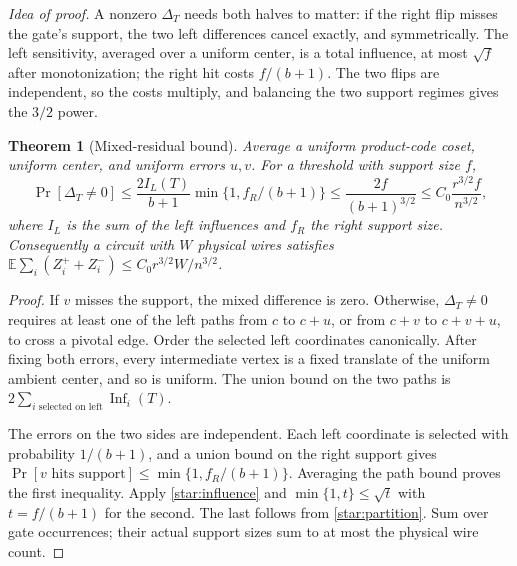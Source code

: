 \documentclass[11pt,letterpaper]{article}
\newtheorem{theorem}{Theorem}[section]
\theoremstyle{definition}
\theoremstyle{remark}
\newcommand{\E}{\mathbb E}
\newcommand{\Inf}{\operatorname{Inf}}
\begin{document}
\emph{Idea of proof.} A nonzero $\Delta_T$ needs both halves to
matter: if the right flip misses the gate's support, the two left
differences cancel exactly, and symmetrically. The left sensitivity,
averaged over a uniform center, is a total influence, at most
$\sqrt f$ after monotonization; the right hit costs $f/(b+1)$. The
two flips are independent, so the costs multiply, and balancing the
two support regimes gives the $3/2$ power.

\begin{theorem}[Mixed-residual bound]
\label{star:population}
Average a uniform product-code coset, uniform center, and uniform errors
$u,v$. For a threshold with support size $f$,
\begin{equation}
\Pr[\Delta_T\ne0]
\le\frac{2 I_L(T)}{b+1}
       \min\{1,f_R/(b+1)\}
\le\frac{2f}{(b+1)^{3/2}}
\le C_0\frac{r^{3/2}f}{n^{3/2}},
\label{star:bound}
\end{equation}
where $I_L$ is the sum of the left influences and $f_R$ the right
support size. Consequently a circuit with $W$ physical wires satisfies
$\E\sum_i(Z_i^++Z_i^-)\le C_0r^{3/2}W/n^{3/2}$.
\end{theorem}
\begin{proof}
If $v$ misses the support, the mixed difference is zero. Otherwise,
$\Delta_T\ne0$ requires at least one of the left paths from $c$ to
$c+u$, or from $c+v$ to $c+v+u$, to cross a pivotal edge. Order the
selected left coordinates canonically. After fixing both errors, every
intermediate vertex is a fixed translate of the uniform ambient center,
and so is uniform. The union bound on the two paths is
$2\sum_{i\text{ selected on left}}\Inf_i(T)$.

The errors on the two sides are independent. Each left coordinate is
selected with probability $1/(b+1)$, and a union bound on the right
support gives $\Pr[v\text{ hits support}]\le
\min\{1,f_R/(b+1)\}$. Averaging the path bound proves the first
inequality. Apply \cref{star:influence} and
$\min\{1,t\}\le\sqrt t$ with $t=f/(b+1)$ for the second.
The last follows from \cref{star:partition}. Sum over gate occurrences;
their actual support sizes sum to at most the physical wire count.
\end{proof}
\end{document}
